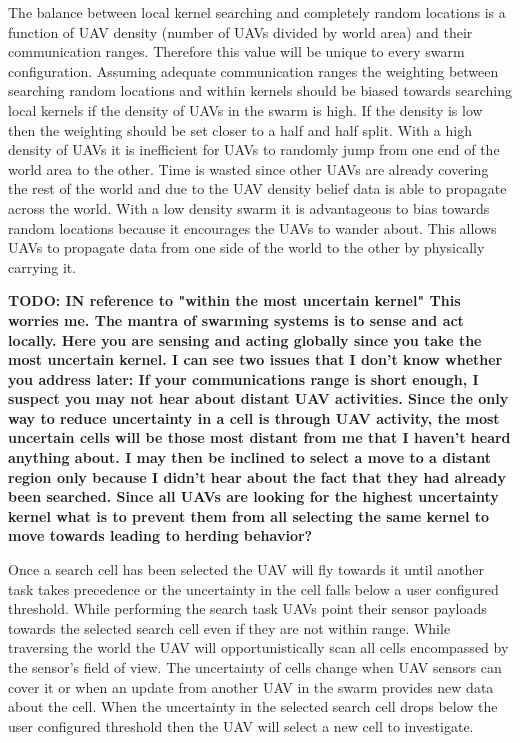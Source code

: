 The balance between local kernel searching and completely random locations is a function of UAV density (number of UAVs divided by world area) and their communication ranges.  Therefore this value will be unique to every swarm configuration.  Assuming adequate communication ranges the weighting between searching random locations and within kernels should be biased towards searching local kernels if the density of UAVs  in the swarm is high.  If the density is low then the weighting should be set closer to a half and half split.  With a high density of UAVs it is inefficient for UAVs to randomly jump from one end of the world area to the other.  Time is wasted since other UAVs are already covering the rest of the world and due to the UAV density belief data is able to propagate across the world.  With a low density swarm it is advantageous to bias towards random locations because it encourages the UAVs to wander about.  This allows UAVs to propagate data from one side of the world to the other by physically carrying it.  

\textbf{TODO: IN reference to "within the most uncertain kernel"
	This worries me. The mantra of swarming systems is to sense and act locally. Here you are sensing and acting globally since you take the most uncertain kernel. I can see two issues that I don’t know whether you address later:
	If your communications range is short enough, I suspect you may not hear about distant UAV activities. Since the only way to reduce uncertainty in a cell is through UAV activity, the most uncertain cells will be those most distant from me that I haven’t heard anything about. I may then be inclined to select a move to a distant region only because I didn’t hear about the fact that they had already been searched. 
	Since all UAVs are looking for the highest uncertainty kernel what is to prevent them from all selecting the same kernel to move towards leading to herding behavior? } 


Once a search cell has been selected the UAV will fly towards it until another task takes precedence or the uncertainty in the cell falls below a user configured threshold.  While performing the search task UAVs point their sensor payloads towards the selected search cell even if they are not within range.  While traversing the world the UAV will opportunistically scan all cells encompassed by the sensor's field of view.  The uncertainty of cells change when UAV sensors can cover it or when an update from another UAV in the swarm provides new data about the cell. When the uncertainty in the selected search cell drops below the user configured threshold then the UAV will select a new cell to investigate.  

